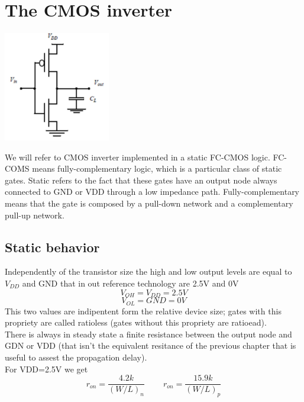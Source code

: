 \chapter{The CMOS inverter}

\centering
\includegraphics[width=0.35\textwidth]{C3_1.png}\\
\raggedright

We will refer to CMOS inverter implemented in a static FC-CMOS logic. FC-COMS means fully-complementary logic, which is a particular class of static gates.
Static refers to the fact that these gates have an output node always connected to GND or VDD through a low impedance path. Fully-complementary means that the gate is composed by a pull-down network and a complementary pull-up network.\\

\section{Static behavior}

Independently of the transistor size the high and low output levels are equal to $V_{DD}$ and GND that in out reference technology are 2.5V and 0V
\begin{equation}
V_{OH}=V_{DD}=2.5V
\end{equation}
\begin{equation}
V_{OL}=GND=0V
\end{equation}
This two values are indipentent form the relative device size; gates with this propriety are called ratioless (gates without this propriety are ratioead).\\
\vspace{5mm}
There is always in steady state a finite resistance between the output node and GDN or VDD (that isn't the equivalent resitance of the previous chapter that is useful to assest the propagation delay).\\
For VDD=2.5V we get
\begin{equation}
r_{on}=\frac{4.2k}{(W/L)_n}\ \ \ \ \ \ \ \ \ \ r_{on}=\frac{15.9k}{(W/L)_p} 
\end{equation}

